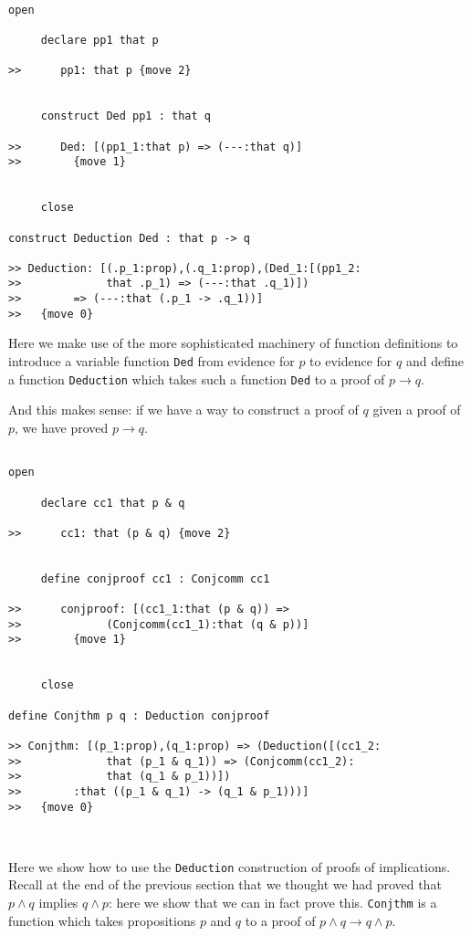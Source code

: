 \documentclass[12pt]{article}
\begin{document}
\begin{verbatim}

open

     declare pp1 that p

>>      pp1: that p {move 2}


     construct Ded pp1 : that q

>>      Ded: [(pp1_1:that p) => (---:that q)]
>>        {move 1}


     close

construct Deduction Ded : that p -> q

>> Deduction: [(.p_1:prop),(.q_1:prop),(Ded_1:[(pp1_2:
>>             that .p_1) => (---:that .q_1)])
>>        => (---:that (.p_1 -> .q_1))]
>>   {move 0}

\end{verbatim}

Here we make use of the more sophisticated machinery of function definitions to introduce a variable function {\tt Ded} from evidence for $p$ to evidence for $q$ and define a function {\tt Deduction} which takes such a function {\tt Ded} to a proof of $p \rightarrow q$.

And this makes sense:  if we have a way to construct a proof of $q$ given a proof of $p$, we have proved $p \rightarrow q$.

\begin{verbatim}

open

     declare cc1 that p & q

>>      cc1: that (p & q) {move 2}


     define conjproof cc1 : Conjcomm cc1

>>      conjproof: [(cc1_1:that (p & q)) => 
>>             (Conjcomm(cc1_1):that (q & p))]
>>        {move 1}


     close

define Conjthm p q : Deduction conjproof

>> Conjthm: [(p_1:prop),(q_1:prop) => (Deduction([(cc1_2:
>>             that (p_1 & q_1)) => (Conjcomm(cc1_2):
>>             that (q_1 & p_1))])
>>        :that ((p_1 & q_1) -> (q_1 & p_1)))]
>>   {move 0}



\end{verbatim}

Here we show how to use the {\tt Deduction} construction of proofs of implications.  Recall at the end of the previous section that we thought we had proved
that $p \wedge q$ implies $q \wedge p$:  here we show that we can in fact prove this.  {\tt Conjthm} is a function which takes propositions $p$ and $q$
to a proof of $p \wedge q \rightarrow q \wedge p$.
\end{document}
